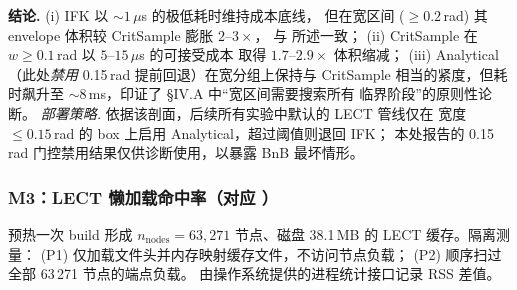 \documentclass[journal]{IEEEtran}
\begin{document}
\begin{table}[ht]
\centering
\caption{epiAABB 源体积–耗时 Pareto（M2， LinkIAABB 包络）。宽盒区间的
Analytical 耗时由第三阶段 BnB 的未解析单元数主导，对每个区间的样本几何敏感
而非随 $w$ 单调，这解释了最宽两档出现
$8170.8\,\mu\text{s}\!>\!7559.9\,\mu\text{s}$ 的非单调反序。}
\label{tab:m2_pareto}
\end{table}

\textbf{结论.} (i) IFK 以 $\sim\!1\,\mu$s 的极低耗时维持成本底线，
但在宽区间 ($\geq\!0.2$\,rad) 其 envelope 体积较 CritSample 膨胀 $2\text{–}3\times$，
与  所述一致；
(ii) CritSample 在 $w\!\geq\!0.1$\,rad 以 $5\text{–}15\,\mu$s 的可接受成本
取得 $1.7\text{–}2.9\times$ 体积缩减；
(iii) Analytical（此处\emph{禁用} 0.15\,rad 提前回退）在宽分组上保持与 CritSample
相当的紧度，但耗时飙升至 ${\sim}8$\,ms，印证了 §IV.A 中“宽区间需要搜索所有
临界阶段”的原则性论断。
\emph{部署策略.} 依据该剖面，后续所有实验中默认的 LECT 管线仅在
宽度 $\le 0.15$\,rad 的 box 上启用 Analytical，超过阈值则退回 IFK；
本处报告的 0.15\,rad 门控禁用结果仅供诊断使用，以暴露 BnB 最坏情形。

\subsubsection{M3：LECT 懒加载命中率（对应 ）}
预热一次 build 形成 $n_\text{nodes}{=}63{,}271$ 节点、磁盘 38.1\,MB 的
LECT 缓存。隔离测量：
(P1) 仅加载文件头并内存映射缓存文件，不访问节点负载；
(P2) 顺序扫过全部 63\,271 节点的端点负载。
由操作系统提供的进程统计接口记录 RSS 差值。
\end{document}

